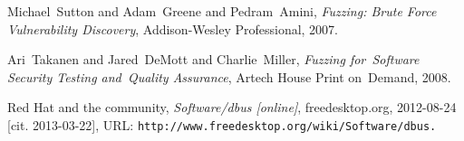 \documentclass[conference]{IEEEtran}
\begin{document}

%
%
%
\begin{thebibliography}{1}

Michael~Sutton and Adam~Greene and Pedram~Amini, \emph{Fuzzing: Brute Force
Vulnerability Discovery}, Addison-Wesley Professional, 2007.

Ari~Takanen and Jared~DeMott and Charlie~Miller, \emph{Fuzzing for~Software
Security Testing and~Quality Assurance}, Artech House Print on~Demand, 2008.

Red Hat and the community, \emph{Software/dbus [online]}, freedesktop.org,
2012-08-24 [cit. 2013-03-22], URL: \tt http://www.freedesktop.org/wiki/Software/dbus.

\end{thebibliography}

\end{document}
